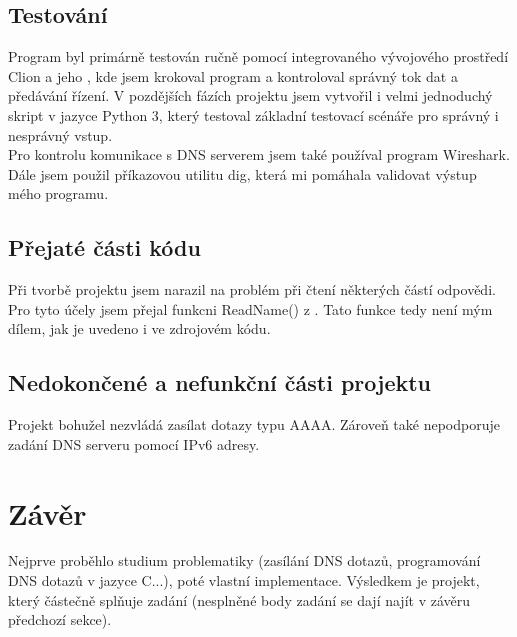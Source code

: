 \documentclass[a4paper, 11pt]{article}
\begin{document}
\subsection{Testování}
Program byl primárně testován ručně pomocí integrovaného vývojového prostředí Clion a jeho , kde jsem krokoval program a kontroloval správný tok dat a předávání řízení. V pozdějších fázích projektu jsem vytvořil i velmi jednoduchý skript v jazyce Python 3, který testoval základní testovací scénáře pro správný i nesprávný vstup.\\
Pro kontrolu komunikace s DNS serverem jsem také používal program Wireshark.\\
Dále jsem použil příkazovou utilitu dig, která mi pomáhala validovat výstup mého programu. \\

\subsection {Přejaté části kódu}
Při tvorbě projektu jsem narazil na problém při čtení některých částí odpovědi. Pro tyto účely jsem přejal funkcni ReadName() z \cite{ReadName}. Tato funkce tedy není mým dílem, jak je uvedeno i ve zdrojovém kódu. \\

\subsection{Nedokončené a nefunkční části projektu}
Projekt bohužel nezvládá zasílat dotazy typu AAAA. Zároveň také nepodporuje zadání DNS serveru pomocí IPv6 adresy.

\section{Závěr}
Nejprve proběhlo studium problematiky (zasílání DNS dotazů, programování DNS dotazů v jazyce C...), poté vlastní implementace. Výsledkem je projekt, který částečně splňuje zadání (nesplněné body zadání se dají najít v závěru předchozí sekce). 
\newpage %

\def\refname{Použité zdroje}

 
\end{document}
